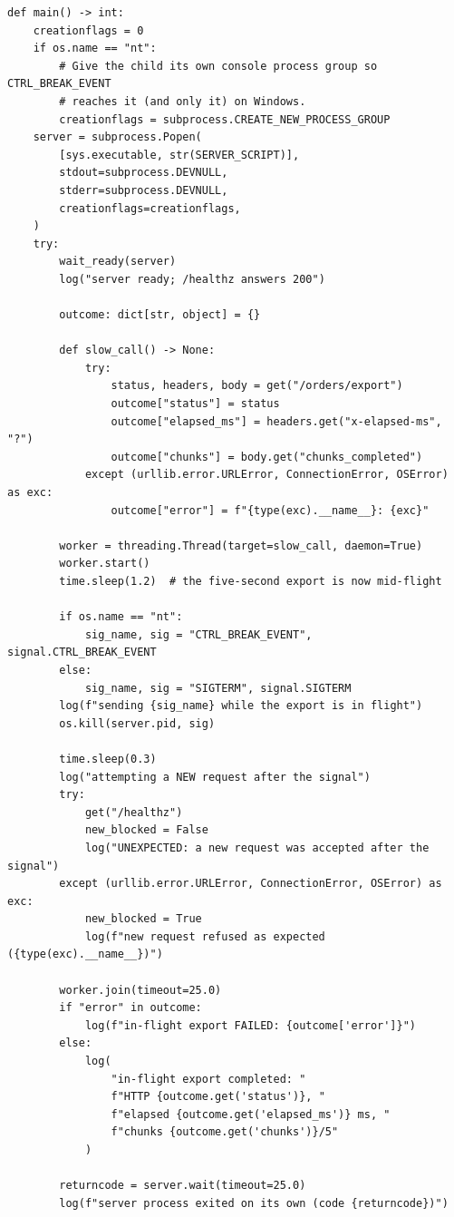 \begin{verbatim}
def main() -> int:
    creationflags = 0
    if os.name == "nt":
        # Give the child its own console process group so CTRL_BREAK_EVENT
        # reaches it (and only it) on Windows.
        creationflags = subprocess.CREATE_NEW_PROCESS_GROUP
    server = subprocess.Popen(
        [sys.executable, str(SERVER_SCRIPT)],
        stdout=subprocess.DEVNULL,
        stderr=subprocess.DEVNULL,
        creationflags=creationflags,
    )
    try:
        wait_ready(server)
        log("server ready; /healthz answers 200")

        outcome: dict[str, object] = {}

        def slow_call() -> None:
            try:
                status, headers, body = get("/orders/export")
                outcome["status"] = status
                outcome["elapsed_ms"] = headers.get("x-elapsed-ms", "?")
                outcome["chunks"] = body.get("chunks_completed")
            except (urllib.error.URLError, ConnectionError, OSError) as exc:
                outcome["error"] = f"{type(exc).__name__}: {exc}"

        worker = threading.Thread(target=slow_call, daemon=True)
        worker.start()
        time.sleep(1.2)  # the five-second export is now mid-flight

        if os.name == "nt":
            sig_name, sig = "CTRL_BREAK_EVENT", signal.CTRL_BREAK_EVENT
        else:
            sig_name, sig = "SIGTERM", signal.SIGTERM
        log(f"sending {sig_name} while the export is in flight")
        os.kill(server.pid, sig)

        time.sleep(0.3)
        log("attempting a NEW request after the signal")
        try:
            get("/healthz")
            new_blocked = False
            log("UNEXPECTED: a new request was accepted after the signal")
        except (urllib.error.URLError, ConnectionError, OSError) as exc:
            new_blocked = True
            log(f"new request refused as expected ({type(exc).__name__})")

        worker.join(timeout=25.0)
        if "error" in outcome:
            log(f"in-flight export FAILED: {outcome['error']}")
        else:
            log(
                "in-flight export completed: "
                f"HTTP {outcome.get('status')}, "
                f"elapsed {outcome.get('elapsed_ms')} ms, "
                f"chunks {outcome.get('chunks')}/5"
            )

        returncode = server.wait(timeout=25.0)
        log(f"server process exited on its own (code {returncode})")


\end{verbatim}
